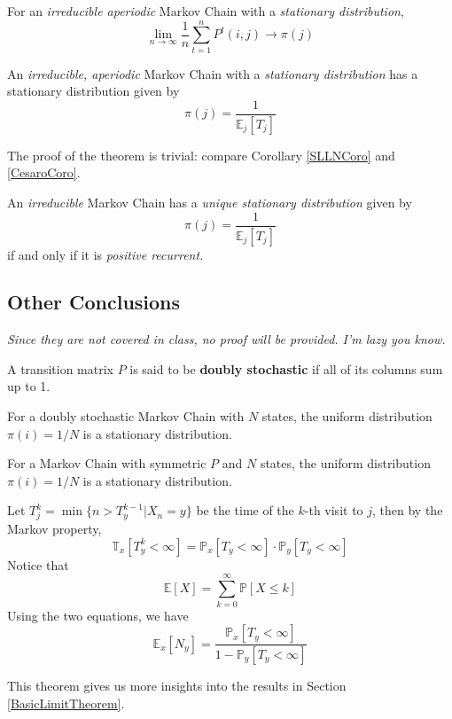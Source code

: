     \begin{corollary}\label{CesaroCoro}
        For an \emph{irreducible aperiodic} Markov Chain with a \emph{stationary distribution},
        \[ \lim_{n\to\infty}\frac{1}{n}\sum_{t=1}^nP^t(i,j) \to \pi(j) \]
    \end{corollary}
    \begin{theorem}
        An \emph{irreducible, aperiodic} Markov Chain with a \emph{stationary distribution} has a stationary distribution given by
        \[ \pi(j) = \frac{1}{\mathbb{E}_j[T_j]} \]
    \end{theorem}
    \begin{sketchproof}
        The proof of the theorem is trivial: compare Corollary \ref{SLLNCoro} and \ref{CesaroCoro}.
    \end{sketchproof}
    \begin{theorem}\label{theorem:FTMC-Countable}
        An \emph{irreducible} Markov Chain has a \emph{unique stationary distribution} given by
        \[ \pi(j) = \frac{1}{\mathbb{E}_j[T_j]} \]
        if and only if it is \emph{positive recurrent}.
    \end{theorem}

    \subsection{Other Conclusions}
    \emph{Since they are not covered in class, no proof will be provided. I'm lazy you know.}
    \begin{definition}
        A transition matrix $P$ is said to be \textbf{doubly stochastic} if all of its columns sum up to 1.
    \end{definition}
    \begin{optTheorem}
        For a doubly stochastic Markov Chain with $N$ states, the uniform distribution $\pi(i) = 1/N$ is a stationary distribution.
    \end{optTheorem}
    \begin{optTheorem}
        For a Markov Chain with symmetric $P$ and $N$ states, the uniform distribution $\pi(i) = 1/N$ is a stationary distribution.
    \end{optTheorem}
    \begin{optTheorem}
        Let $T_j^k = \min\{ n > T_y^{k-1} | X_n = y \}$ be the time of the $k$-th visit to $j$, then by the Markov property,
        \[ \mathbb{T}_x[T_y^k < \infty] = \mathbb{P}_x[T_y < \infty]\cdot\mathbb{P}_y[T_y<\infty] \]
        Notice that
        \[ \mathbb{E}[X] = \sum_{k=0}^{\infty}\mathbb{P}[X \le k] \]
        Using the two equations, we have
        \[ \mathbb{E}_x[N_y] = \frac{\mathbb{P}_x[T_y < \infty]}{1-\mathbb{P}_y[T_y < \infty]} \]
    \end{optTheorem}
    \begin{remark}
        This theorem gives us more insights into the results in Section \ref{BasicLimitTheorem}.
    \end{remark}



